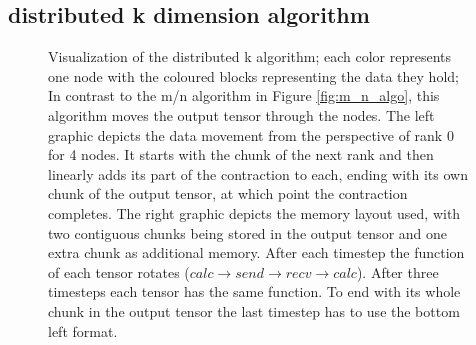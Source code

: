 
\subsection{distributed k dimension algorithm}

\begin{figure}[h]
    \caption{Visualization of the distributed k algorithm; 
    each color represents one node with the coloured blocks representing the data they hold; 
    In contrast to the m/n algorithm in Figure \ref{fig:m_n_algo}, this algorithm moves the output tensor through the nodes.
    The left graphic depicts the data movement from the perspective of rank 0 for 4 nodes.
    It starts with the chunk of the next rank and then linearly adds its part of the contraction to each, ending with its own chunk of the output tensor, at which point the contraction completes.
    The right graphic depicts the memory layout used, with two contiguous chunks being stored in the output tensor and one extra chunk as additional memory.
    After each timestep the function of each tensor rotates ($calc \rightarrow send \rightarrow recv \rightarrow calc$).
    After three timesteps each tensor has the same function.
    To end with its whole chunk in the output tensor the last timestep has to use the bottom left format.
    }
    \label{fig:k_algo}
\end{figure}


